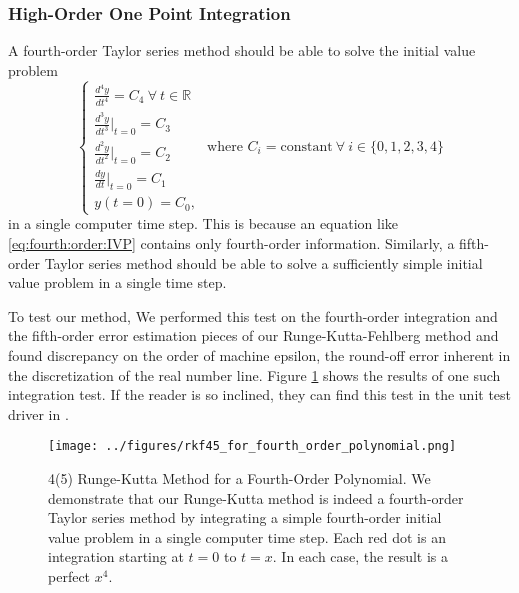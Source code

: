 \documentclass[]{article}
\newcommand{\R}{\mathbb{R}} %
\newcommand{\eval}{\biggr\rvert} %
\begin{document}
\subsubsection{High-Order One Point Integration}
\label{subsubsec:one-point}

A fourth-order Taylor series method should be able to solve the
initial value problem
\begin{equation}
  \label{eq:fourth:order:IVP}
  \begin{cases}
  \frac{d^4 y}{d t^4} = C_4\ \forall\ t\in\R\\
  \frac{d^3 y}{d t^3}\eval_{t=0} = C_3\\
  \frac{d^2 y}{d t^2}\eval_{t=0} = C_2\\
  \frac{d y}{dt}\eval_{t=0} = C_1\\
  y(t=0) = C_0,
  \end{cases}\text{ where }C_i=\text{constant}\ \forall\ i\in\{0,1,2,3,4\}
\end{equation}
in a single computer time step. This is because an equation like
\eqref{eq:fourth:order:IVP} contains only fourth-order
information. Similarly, a fifth-order Taylor series method should be
able to solve a sufficiently simple initial value problem in a single
time step. 

To test our method, We performed this test on the fourth-order
integration and the fifth-order error estimation pieces of our
Runge-Kutta-Fehlberg method and found discrepancy on the order of
machine epsilon, the round-off error inherent in the discretization of
the real number line. Figure \ref{fig:polynomial:integration} shows
the results of one such integration test. If the reader is so
inclined, they can find this test in the unit test driver in
\cite{RKF45}.

\begin{figure}[h!t!b!]
  \begin{center}
    \leavevmode
    \texttt{[image: ../figures/rkf45\_for\_fourth\_order\_polynomial.png]}
    \caption[4(5) Runge-Kutta Method for a Fourth-Order
    Polynomial]{4(5) Runge-Kutta Method for a Fourth-Order
      Polynomial. We demonstrate that our Runge-Kutta method is indeed
      a fourth-order Taylor series method by integrating a simple
      fourth-order initial value problem in a single computer time
      step. Each red dot is an integration starting at $t=0$ to
      $t=x$. In each case, the result is a perfect $x^4$.}
    \label{fig:polynomial:integration}
  \end{center}
\end{figure}
\end{document}
